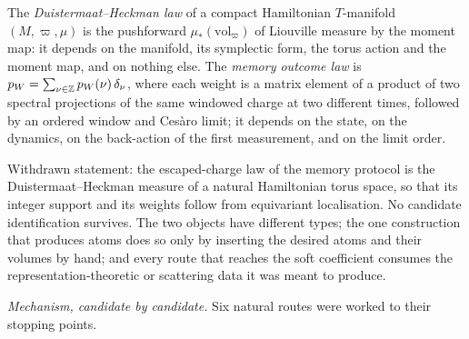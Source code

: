 \begin{definition}
\label{def:dh-objects}
The \emph{Duistermaat--Heckman law} of a compact Hamiltonian $T$-manifold
$(M,\varpi,\mu)$ is the pushforward $\mu_*(\mathrm{vol}_\varpi)$ of Liouville
measure by the moment map: it depends on the manifold, its symplectic form,
the torus action and the moment map, and on nothing else. The \emph{memory
outcome law} is $p_W = \sum_{\nu \in \mathbb{Z}} p_W(\nu)\,\delta_\nu$, where each
weight is a matrix element of a product of two spectral projections of the
same windowed charge at two different times, followed by an ordered window and
Ces\`aro limit; it depends on the state, on the dynamics, on the back-action
of the first measurement, and on the limit order.
\end{definition}

\begin{refutedclaim}
\label{ref:dh-law}
Withdrawn statement: the escaped-charge law of the memory protocol is the
Duistermaat--Heckman measure of a natural Hamiltonian torus space, so that its
integer support and its weights follow from equivariant localisation. No
candidate identification survives. The two objects have different types; the
one construction that produces atoms does so only by inserting the desired
atoms and their volumes by hand; and every route that reaches the soft
coefficient consumes the representation-theoretic or scattering data it was
meant to produce.
\end{refutedclaim}

\emph{Mechanism, candidate by candidate.} Six natural routes were worked to
their stopping points.

